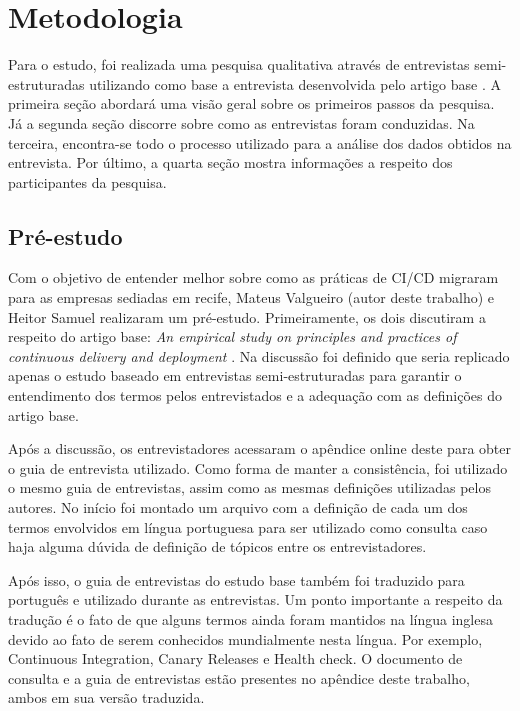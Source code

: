 
\chapter{Metodologia}

Para o estudo, foi realizada uma pesquisa qualitativa através de entrevistas semi-estruturadas utilizando como base a entrevista desenvolvida pelo artigo base \cite{empiricalStudy2016}. A primeira seção abordará uma visão geral sobre os primeiros passos da pesquisa.  Já a segunda seção discorre sobre como as entrevistas foram conduzidas. Na terceira, encontra-se todo o processo utilizado para a análise dos dados obtidos na entrevista. Por último, a quarta seção mostra informações a respeito dos participantes da pesquisa.


\section{Pré-estudo}

Com o objetivo de entender melhor sobre como as práticas de CI/CD migraram para as empresas sediadas em recife, Mateus Valgueiro (autor deste trabalho) e Heitor Samuel realizaram um pré-estudo. Primeiramente, os dois discutiram a respeito do artigo base: \emph{An empirical study on principles and practices of continuous delivery and deployment} \cite{empiricalStudy2016}. Na discussão foi definido que seria replicado apenas o estudo baseado em entrevistas semi-estruturadas para garantir o entendimento dos termos pelos entrevistados e a adequação com as definições do artigo base. 

Após a discussão, os entrevistadores acessaram o apêndice online deste \cite{empiricalStudyOnlineAppendix} para obter o guia de entrevista utilizado. Como forma de manter a consistência, foi utilizado o mesmo guia de entrevistas, assim como as mesmas definições utilizadas pelos autores. No início foi montado um arquivo com a definição de cada um dos termos envolvidos em língua portuguesa para ser utilizado como consulta caso haja alguma dúvida de definição de tópicos entre os entrevistadores.

Após isso, o guia de entrevistas do estudo base \cite{empiricalStudyOnlineAppendix} também foi traduzido para português e utilizado durante as entrevistas. Um ponto importante a respeito da tradução é o fato de que alguns termos ainda foram mantidos na língua inglesa devido ao fato de serem conhecidos mundialmente nesta língua. Por exemplo, Continuous Integration, Canary Releases e Health check.
O documento de consulta e a guia de entrevistas estão presentes no apêndice deste trabalho, ambos em sua versão traduzida.

